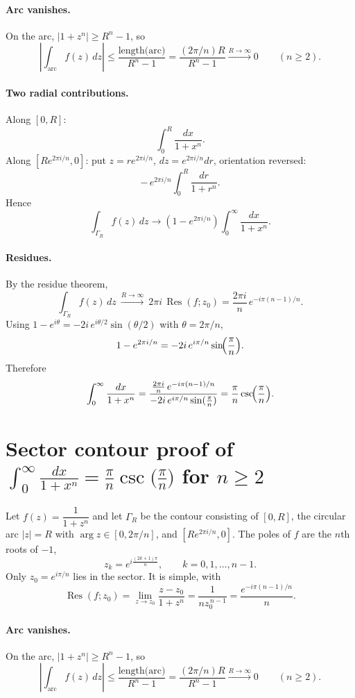 \documentclass[12pt,a4paper]{article}
\begin{document}
\paragraph{Arc vanishes.}
On the arc, \(|1+z^{n}|\ge R^{n}-1\), so
\[
\left|\int_{\text{arc}} f(z)\,dz\right|
\le \frac{\text{length(arc)}}{R^{n}-1}
=\frac{(2\pi/n)R}{R^{n}-1}\xrightarrow{R\to\infty}0\qquad(n\ge2).
\]

\paragraph{Two radial contributions.}
Along \([0,R]\):
\[
\int_{0}^{R}\frac{dx}{1+x^{n}}.
\]
Along \([Re^{2\pi i/n},0]\): put \(z=re^{2\pi i/n}\), \(dz=e^{2\pi i/n}dr\), orientation reversed:
\[
-\,e^{2\pi i/n}\int_{0}^{R}\frac{dr}{1+r^{n}}.
\]
Hence
\[
\int_{\Gamma_R} f(z)\,dz
\longrightarrow (1-e^{2\pi i/n})\int_{0}^{\infty}\frac{dx}{1+x^{n}}.
\]

\paragraph{Residues.}
By the residue theorem,
\[
\int_{\Gamma_R} f(z)\,dz \ \xrightarrow{R\to\infty}\ 2\pi i\,\operatorname{Res}(f;z_0)
=\frac{2\pi i}{n}\,e^{-i\pi(n-1)/n}.
\]
Using \(1-e^{i\theta}=-2i\,e^{i\theta/2}\sin(\theta/2)\) with \(\theta=2\pi/n\),
\[
1-e^{2\pi i/n}=-2i\,e^{i\pi/n}\sin\!\Bigl(\frac{\pi}{n}\Bigr).
\]
Therefore
\[
\int_{0}^{\infty}\frac{dx}{1+x^{n}}
=\frac{ \frac{2\pi i}{n}\,e^{-i\pi(n-1)/n} }
{ -2i\,e^{i\pi/n}\sin(\frac{\pi}{n}) }
=\frac{\pi}{n}\csc\!\Bigl(\frac{\pi}{n}\Bigr).
\]


\section*{Sector contour proof of \(\displaystyle \int_{0}^{\infty}\frac{dx}{1+x^{n}}=\frac{\pi}{n}\csc\!\bigl(\frac{\pi}{n}\bigr)\) for \(n\ge2\)}

Let \(f(z)=\dfrac{1}{1+z^{n}}\) and let \(\Gamma_R\) be the contour consisting of
\([0,R]\), the circular arc \(|z|=R\) with \(\arg z\in[0,2\pi/n]\), and
\([Re^{2\pi i/n},0]\). The poles of \(f\) are the \(n\)th roots of \(-1\),
\[
z_k=e^{i\frac{(2k+1)\pi}{n}},\qquad k=0,1,\dots,n-1.
\]
Only \(z_0=e^{i\pi/n}\) lies in the sector. It is simple, with
\[
\operatorname{Res}(f;z_0)
=\lim_{z\to z_0}\frac{z-z_0}{1+z^{n}}
=\frac{1}{n z_0^{\,n-1}}
=\frac{e^{-i\pi(n-1)/n}}{n}.
\]

\paragraph{Arc vanishes.}
On the arc, \(|1+z^{n}|\ge R^{n}-1\), so
\[
\left|\int_{\text{arc}} f(z)\,dz\right|
\le \frac{\text{length(arc)}}{R^{n}-1}
=\frac{(2\pi/n)R}{R^{n}-1}\xrightarrow{R\to\infty}0\qquad(n\ge2).
\]
\end{document}
